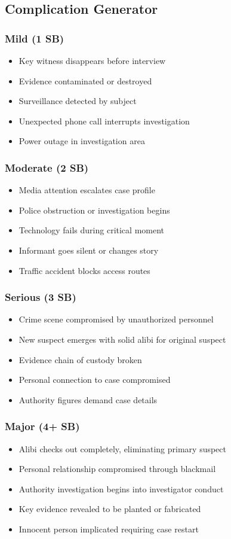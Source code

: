 \documentclass[11pt]{article}
\begin{document}
\subsection{Complication Generator}

\subsubsection{Mild (1 SB)}
\begin{itemize}
\item Key witness disappears before interview
\item Evidence contaminated or destroyed
\item Surveillance detected by subject
\item Unexpected phone call interrupts investigation
\item Power outage in investigation area
\end{itemize}

\subsubsection{Moderate (2 SB)}
\begin{itemize}
\item Media attention escalates case profile
\item Police obstruction or investigation begins
\item Technology fails during critical moment
\item Informant goes silent or changes story
\item Traffic accident blocks access routes
\end{itemize}

\subsubsection{Serious (3 SB)}
\begin{itemize}
\item Crime scene compromised by unauthorized personnel
\item New suspect emerges with solid alibi for original suspect
\item Evidence chain of custody broken
\item Personal connection to case compromised
\item Authority figures demand case details
\end{itemize}

\subsubsection{Major (4+ SB)}
\begin{itemize}
\item Alibi checks out completely, eliminating primary suspect
\item Personal relationship compromised through blackmail
\item Authority investigation begins into investigator conduct
\item Key evidence revealed to be planted or fabricated
\item Innocent person implicated requiring case restart
\end{itemize}
\end{document}
